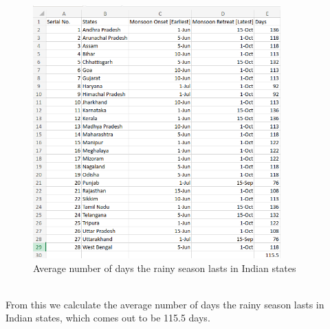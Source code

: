 \documentclass{report}
\begin{document}
\begin{Center}
  \begin{figure}[h!]
    \includegraphics[width=0.85\textwidth]{AvgMonsoon.png}
    \caption{Average number of days the rainy season lasts in Indian states}
   \end{figure}
 \end{Center}
\\ From this we calculate the average number of days the rainy season lasts in Indian states, which comes out to be 115.5 days.
\newpage
\end{document}
